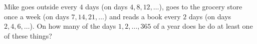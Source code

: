 Mike goes outside every $4$ days (on days $4,8,12,\dots$), goes to the grocery store once a week (on days $7,14,21,\dots$) and reads a book every $2$ days (on days $2,4,6,\dots$). On how many of the days $1,2,\dots,365$ of a year does he do at least one of these things?
